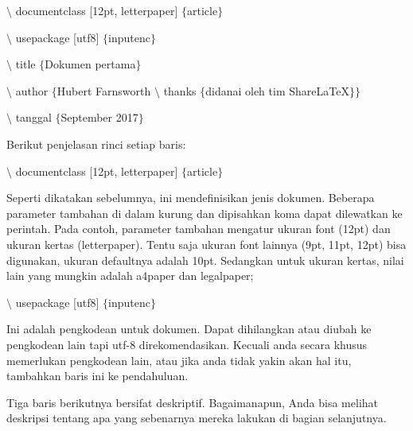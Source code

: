 \begin{itemize}
\hspace*{0.5in}$\setminus$ documentclass [12pt, letterpaper] $ \{ $article$ \} $\par

\hspace*{0.5in}$\setminus$ usepackage [utf8] $ \{ $inputenc$ \} $\par

\hspace*{0.5in}$\setminus$ title $ \{ $Dokumen pertama$ \} $\par

\hspace*{0.5in}$\setminus$ author $ \{ $Hubert Farnsworth $\setminus$ thanks $ \{ $didanai oleh tim ShareLaTeX$ \} $$ \} $\par

\hspace*{0.5in}$\setminus$ tanggal $ \{ $September 2017$ \} $\par

Berikut penjelasan rinci setiap baris:\par

$\setminus$ documentclass [12pt, letterpaper] $ \{ $article$ \} $\par

\hspace*{0.5in}Seperti dikatakan sebelumnya, ini mendefinisikan jenis dokumen. Beberapa parameter tambahan di dalam kurung dan dipisahkan koma dapat dilewatkan ke perintah. Pada contoh, parameter tambahan mengatur ukuran font (12pt) dan ukuran kertas (letterpaper). Tentu saja ukuran font lainnya (9pt, 11pt, 12pt) bisa digunakan, ukuran defaultnya adalah 10pt. Sedangkan untuk ukuran kertas, nilai lain yang mungkin adalah a4paper dan legalpaper; \par

$\setminus$ usepackage [utf8] $ \{ $inputenc$ \} $\par

\hspace*{0.5in}Ini adalah pengkodean untuk dokumen. Dapat dihilangkan atau diubah ke pengkodean lain tapi utf-8 direkomendasikan. Kecuali anda secara khusus memerlukan pengkodean lain, atau jika anda tidak yakin akan hal itu, tambahkan baris ini ke pendahuluan.\par

\hspace*{0.5in}Tiga baris berikutnya bersifat deskriptif. Bagaimanapun, Anda bisa melihat deskripsi tentang apa yang sebenarnya mereka lakukan di bagian selanjutnya.\par


\end{itemize}

